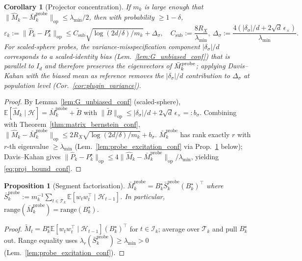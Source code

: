 \documentclass{article}
\newcommand{\E}{\mathbb{E}}
\newcommand{\op}{\mathrm{op}}
\newcommand{\cH}{\mathcal{H}}
\newcommand{\cT}{\mathcal{T}}
\newcommand{\cI}{\mathcal{I}}
\newcommand{\range}{\mathrm{range}}
\newtheorem{corollary}{Corollary}
\newtheorem{proposition}{Proposition}
\begin{document}
\begin{corollary}[Projector concentration]
\label{cor:projector_conf}
If $m_k$ is large enough that
$\|\widehat M_k - \bar M_k^{\mathrm{probe}}\|_\op \le \lambda_{\min}/2$,
then with probability $\ge 1-\delta$,
\begin{equation}
\varepsilon_k := \|\widehat P_k - P_k^\star\|_\op
\le C_{\mathrm{sub}}\sqrt{\log(2d/\delta)/m_k}
+ \Delta_\sigma,\quad
C_{\mathrm{sub}} := \frac{8 R_X}{\lambda_{\min}},\
\Delta_\sigma := \frac{4(|\delta_\sigma|/d + 2\sqrt d\,\epsilon_\times)}{\lambda_{\min}}.
\label{eq:proj_bound_conf}
\end{equation}
For scaled-sphere probes, the variance-misspecification component
$|\delta_\sigma|/d$ corresponds to a scaled-identity bias
(Lem.~\ref{lem:G_unbiased_conf}) that is parallel to $I_d$ and
therefore preserves the eigenvectors of $\bar M_k^{\rm probe}$;
applying Davis--Kahan with the biased mean as reference removes the
$|\delta_\sigma|/d$ contribution to $\Delta_\sigma$ at population
level (Cor.~\ref{cor:plugin_variance}).
\end{corollary}
\begin{proof}
By Lemma~\ref{lem:G_unbiased_conf} (scaled-sphere),
$\E[\widehat M_k\mid\cH] = \bar M_k^{\mathrm{probe}} + \widetilde B$
with $\|\widetilde B\|_\op \le |\delta_\sigma|/d + 2\sqrt d\,\epsilon_\times
=: b_\sigma$. Combining with
Theorem~\ref{thm:matrix_bernstein_conf},
$\|\widehat M_k - \bar M_k^{\mathrm{probe}}\|_\op
\le 2R_X\sqrt{\log(2d/\delta)/m_k} + b_\sigma$.
$\bar M_k^{\mathrm{probe}}$ has rank exactly $r$ with $r$-th
eigenvalue $\ge\lambda_{\min}$ (Lem.~\ref{lem:probe_excitation_conf}
via Prop.~\ref{prop:segment_factorization_conf} below); Davis--Kahan
\citep[Thm.~VII.3.1]{bhatia2013matrix} gives
$\|\widehat P_k - P_k^\star\|_\op\le 4\|\widehat M_k - \bar M_k^{\mathrm{probe}}\|_\op / \lambda_{\min}$,
yielding \eqref{eq:proj_bound_conf}.
\end{proof}

\begin{proposition}[Segment factorisation]
\label{prop:segment_factorization_conf}
$\bar M_k^{\mathrm{probe}} = B_k^\star \bar S_k^{\mathrm{probe}} (B_k^\star)^\top$ where
$\bar S_k^{\mathrm{probe}} := m_k^{-1}\sum_{t\in\cT_k}\E[w_tw_t^\top\mid\cH_{t-1}]$.
In particular, $\range(\bar M_k^{\mathrm{probe}}) = \range(B_k^\star)$.
\end{proposition}
\begin{proof}
$\widetilde M_t = B_k^\star \E[w_tw_t^\top\mid\cH_{t-1}](B_k^\star)^\top$
for $t\in\cI_k$; average over $\cT_k$ and pull $B_k^\star$ out.
Range equality uses
$\lambda_r(\bar S_k^{\mathrm{probe}})\ge\lambda_{\min}>0$
(Lem.~\ref{lem:probe_excitation_conf}).
\end{proof}
\end{document}
